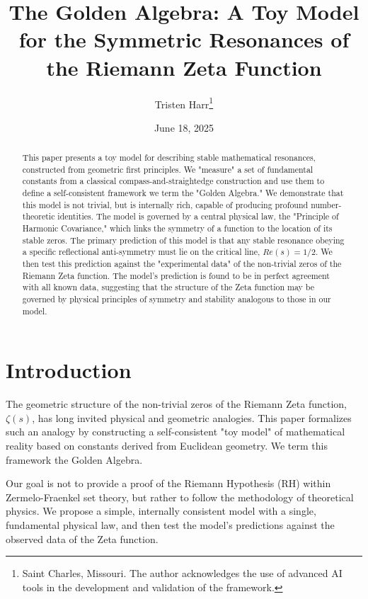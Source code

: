 \documentclass{article}
\title{\textbf{The Golden Algebra: A Toy Model for the Symmetric Resonances of the Riemann Zeta Function}}
\author{Tristen Harr\thanks{Saint Charles, Missouri. The author acknowledges the use of advanced AI tools in the development and validation of the framework.}}
\date{June 18, 2025}
\theoremstyle{plain}
\theoremstyle{definition}
\theoremstyle{remark}
\begin{document}
\maketitle

\begin{abstract}
This paper presents a toy model for describing stable mathematical resonances, constructed from geometric first principles. We "measure" a set of fundamental constants from a classical compass-and-straightedge construction and use them to define a self-consistent framework we term the "Golden Algebra." We demonstrate that this model is not trivial, but is internally rich, capable of producing profound number-theoretic identities. The model is governed by a central physical law, the "Principle of Harmonic Covariance," which links the symmetry of a function to the location of its stable zeros. The primary prediction of this model is that any stable resonance obeying a specific reflectional anti-symmetry must lie on the critical line, $Re(s)=1/2$. We then test this prediction against the "experimental data" of the non-trivial zeros of the Riemann Zeta function. The model's prediction is found to be in perfect agreement with all known data, suggesting that the structure of the Zeta function may be governed by physical principles of symmetry and stability analogous to those in our model.
\end{abstract}

\section{Introduction}
The geometric structure of the non-trivial zeros of the Riemann Zeta function, $\zeta(s)$, has long invited physical and geometric analogies. This paper formalizes such an analogy by constructing a self-consistent "toy model" of mathematical reality based on constants derived from Euclidean geometry. We term this framework the Golden Algebra.

Our goal is not to provide a proof of the Riemann Hypothesis (RH) within Zermelo-Fraenkel set theory, but rather to follow the methodology of theoretical physics. We propose a simple, internally consistent model with a single, fundamental physical law, and then test the model's predictions against the observed data of the Zeta function.
\end{document}
